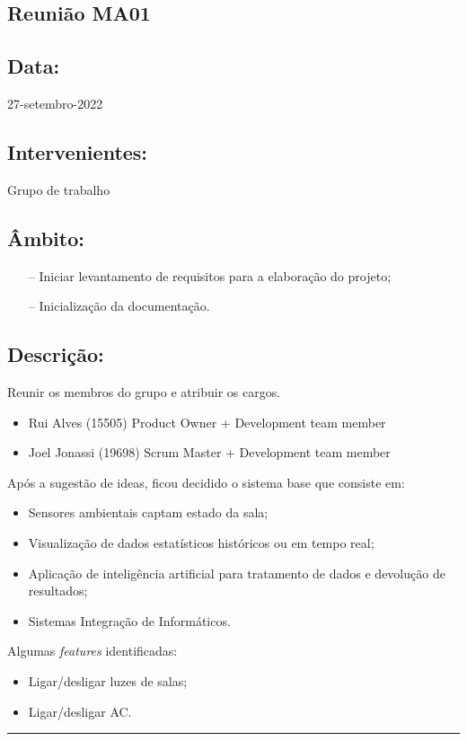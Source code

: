 
\subsection{Reunião MA01}\label{reuniaoMA01}

\subsection*{Data:}
27-setembro-2022

\subsection*{Intervenientes:}
Grupo de trabalho

\subsection*{Âmbito:}
\begin{itemize}
\item[--] Iniciar levantamento de requisitos para a elaboração do projeto;
\item[--] Inicialização da documentação.
\end{itemize}

\subsection*{Descrição:}

\noindent Reunir os membros do grupo e atribuir os cargos.
\begin{itemize}
\item Rui Alves (15505) Product Owner + Development team member
\item Joel Jonassi (19698) Scrum Master + Development team member
\end{itemize}

\noindent Após a sugestão de ideas, ficou decidido o sistema base que consiste em:

\begin{itemize}
	\item Sensores ambientais captam estado da sala;
	\item Visualização de dados estatísticos históricos ou em tempo real;
	\item Aplicação de inteligência artificial para tratamento de dados e devolução de resultados;
	\item Sistemas Integração de Informáticos.
\end{itemize}

\noindent Algumas \textit{features} identificadas:

\begin{itemize}
	\item Ligar/desligar luzes de salas;
	\item Ligar/desligar AC.
\end{itemize}


\noindent \rule{\linewidth}{0.4pt}
\newline
